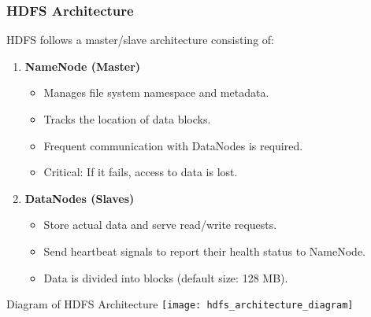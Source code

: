 \documentclass[aspectratio=169]{beamer}
\begin{document}
\begin{frame}[fragile]
    \frametitle{HDFS Architecture}
    HDFS follows a master/slave architecture consisting of:
    \begin{enumerate}
        \item \textbf{NameNode (Master)}
            \begin{itemize}
                \item Manages file system namespace and metadata.
                \item Tracks the location of data blocks.
                \item Frequent communication with DataNodes is required.
                \item Critical: If it fails, access to data is lost.
            \end{itemize}
        \item \textbf{DataNodes (Slaves)}
            \begin{itemize}
                \item Store actual data and serve read/write requests.
                \item Send heartbeat signals to report their health status to NameNode.
                \item Data is divided into blocks (default size: 128 MB).
            \end{itemize}
    \end{enumerate}
    \begin{block}{Diagram of HDFS Architecture}
    \centering
    \texttt{[image: hdfs\_architecture\_diagram]} %
    \end{block}
\end{frame}
\end{document}

